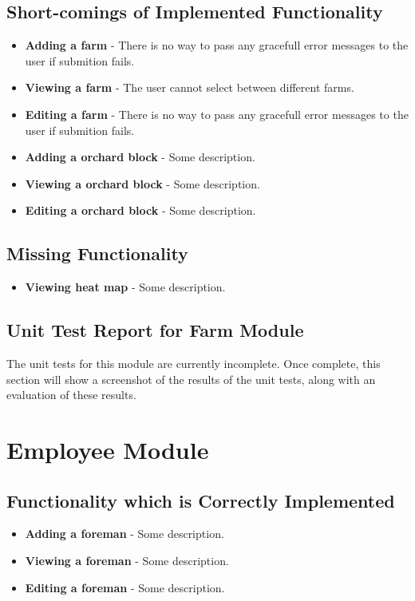 \documentclass[11pt,fleqn]{book} %
\begin{document}
	\section{Short-comings of Implemented Functionality}
		\begin{itemize}
			\item\textbf{Adding a farm} -
			There is no way to pass any gracefull error messages to the user if submition fails.
			
			\item\textbf{Viewing a farm} -
			The user cannot select between different farms.
			
			\item\textbf{Editing a farm} -
			There is no way to pass any gracefull error messages to the user if submition fails.
			
			\item\textbf{Adding a orchard block} -
			Some description. 
			
			\item\textbf{Viewing a orchard block} -
			Some description.
			
			\item\textbf{Editing a orchard block} -
			Some description.
		\end{itemize}
	\section{Missing Functionality}
		\begin{itemize}
			\item\textbf{Viewing heat map} -
			Some description.
		\end{itemize}
	\section{Unit Test Report for Farm Module}
		The unit tests for this module are currently incomplete. Once complete, this section will show a screenshot of the results of the unit tests, along with an evaluation of these results.



\chapter{Employee Module}
	\section{Functionality which is Correctly Implemented}
		\begin{itemize}
			\item\textbf{Adding a foreman} -
			Some description. 
			
			\item\textbf{Viewing a foreman} -
			Some description.
			
			\item\textbf{Editing a foreman} -
			Some description.
		\end{itemize}
\end{document}
